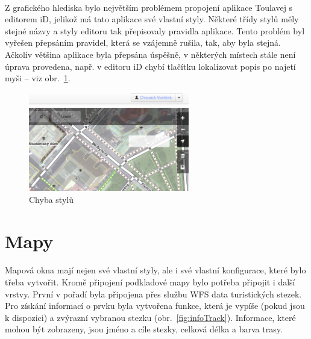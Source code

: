 \documentclass[11pt,a4paper,titlepage,oneside]{book}
\begin{document}
			\paragraph{} Z grafického hlediska bylo největším problémem propojení aplikace Toulavej s editorem iD, jelikož má tato aplikace své vlastní styly. Některé třídy stylů měly stejné názvy a  styly editoru tak přepisovaly pravidla aplikace. Tento problém byl vyřešen přepsáním pravidel, která se vzájemně rušila, tak, aby byla stejná. Ačkoliv většina aplikace byla přepsána úspěšně, v některých místech stále není úprava provedena, např. v editoru iD chybí tlačítku lokalizovat popis po najetí myši -- viz obr.~\ref{fig:error_locate}.
		\begin{figure}[!h]
			\begin{center}
				\includegraphics[width=7cm]{obrazky/toulavej/chyba_locate.png}
				\caption{Chyba stylů}
				\label{fig:error_locate}
			\end{center}
		\end{figure}	



		\section{Mapy} %
			\paragraph{} Mapová okna mají nejen své vlastní styly, ale i své vlastní konfigurace, které bylo třeba vytvořit. Kromě připojení podkladové mapy bylo potřeba připojit i další vrstvy. První v pořadí byla připojena přes službu WFS data turistických stezek. Pro získání informací o prvku byla vytvořena funkce, která je vypíše (pokud jsou k dispozici) a zvýrazní vybranou stezku (obr.~\ref{fig:infoTrack}). Informace, které mohou být zobrazeny, jsou jméno a cíle stezky, celková délka a barva trasy.
\end{document}
